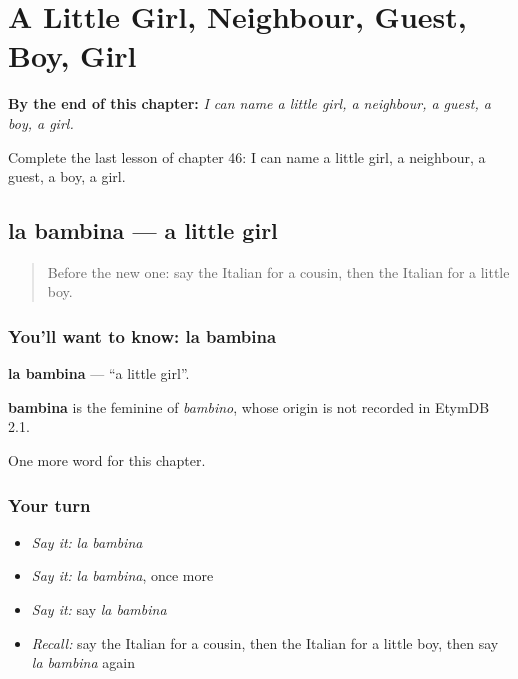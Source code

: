 
\chapter{A Little Girl, Neighbour, Guest, Boy, Girl}
\label{ch:it-a-little-girl-neighbour-guest-boy-girl}

\begin{chapteropening}
\textbf{By the end of this chapter:} \emph{I can name a little girl, a neighbour, a guest, a boy, a girl.}

Complete the last lesson of chapter 46: I can name a little girl, a neighbour, a guest, a boy, a girl.
\end{chapteropening}

\section[la bambina]{la bambina — a little girl}

\label{lesson:IT-C46-bambina}



\begin{quote}
Before the new one: say the Italian for a cousin, then the Italian for a little boy.
\end{quote}

\subsection*{You'll want to know: la bambina}
\textbf{la bambina} — \textquotedblleft{}a little girl\textquotedblright{}.

\begin{cousinweb}
\textbf{bambina} is the feminine of \emph{bambino}, whose origin is not recorded in EtymDB 2.1.
\end{cousinweb}

\begin{grammarlens}[title={What you've built}]
One more word for this chapter.
\end{grammarlens}

\subsection*{Your turn}
\begin{itemize}
\raggedright
  \item \emph{Say it:} \emph{la bambina}
  \item \emph{Say it:} \emph{la bambina}, once more
  \item \emph{Say it:} say \emph{la bambina}
  \item \emph{Recall:} say the Italian for a cousin, then the Italian for a little boy, then say \emph{la bambina} again
\end{itemize}


